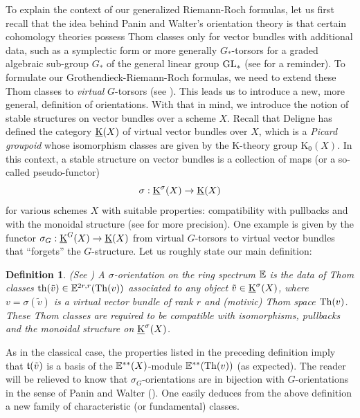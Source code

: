 \documentclass[11pt,leqno]{amsart}
\newtheorem{dfi}[thmi]{Definition}
\theoremstyle{remark}
\theoremstyle{definition}
\numberwithin{equation}{thm}
\begin{document}
To explain the context of our generalized Riemann-Roch formulas,
 let us first recall that the idea behind Panin and Walter's orientation theory
 is that certain cohomology theories possess Thom classes only for vector bundles
 with additional data, such as a symplectic form or more generally
 $G_*$-torsors for a graded algebraic sub-group $G_*$ of the
 general linear group $\mathrm{GL}_*$ (see  for a reminder).
 To formulate our Grothendieck-Riemann-Roch formulas, we need to
 extend these Thom classes to \emph{virtual} $G$-torsors (see ).
 This leads us to introduce a new, more general, definition of orientations.
 With that in mind, we introduce the notion of stable structures on vector bundles over a scheme $X$.
 Recall that Deligne has defined the category $\operatorname{\underline K}(X)$ of virtual vector bundles over $X$,
 which is a \emph{Picard groupoid} whose isomorphism classes are given by the 
 K-theory group $\mathrm{K}_0(X)$.
In this context, a stable structure on vector bundles is a collection of maps (or a so-called pseudo-functor)
$$
\sigma:\operatorname{\underline K}^\sigma(X) \rightarrow \operatorname{\underline K}(X)
$$
for various schemes $X$ with suitable properties: compatibility with pullbacks
 and with the monoidal structure (see  for more precision).
 One example is given by the functor $\sigma_G:\operatorname{\underline K}^G(X) \rightarrow \operatorname{\underline K}(X)$ from virtual $G$-torsors
 to virtual vector bundles that ``forgets'' the $G$-structure.
 Let us roughly state our main definition:
\begin{dfi}(See )
A $\sigma$-orientation on the ring spectrum $\mathbb E$ is 
 the data of Thom classes $\operatorname{th}(\tilde v) \in \mathbb E^{2r,r}(\operatorname{Th}(v))$ 
 associated to any object $\tilde v \in \operatorname{\underline K}^\sigma(X)$, where $v=\sigma(\tilde v)$
 is a virtual vector bundle of rank $r$ and (motivic) Thom space $\operatorname{Th}(v)$.
 These Thom classes are required to be compatible with isomorphisms, pullbacks
 and the monoidal structure on $\operatorname{\underline K}^\sigma(X)$.
\end{dfi}
As in the classical case, the properties listed in the preceding definition imply
 that $\mathfrak{t}(\tilde v)$ is a basis of the $\mathbb E^{**}(X)$-module
 $\mathbb E^{**}(\operatorname{Th}(v))$ (as expected). The reader will be relieved 
 to know that $\sigma_G$-orientations are in bijection with $G$-orientations
 in the sense of Panin and Walter ().
 One easily deduces from the above definition
 a new family of characteristic (or fundamental) classes.
 
\end{document}
